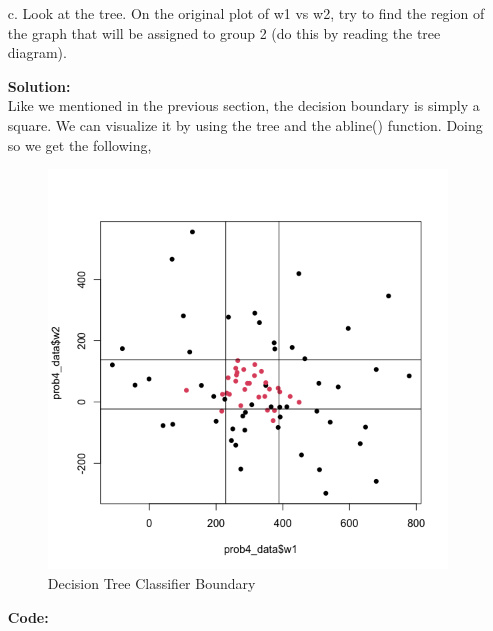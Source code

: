 \documentclass[12pt]{article}
\makeatletter
\theoremstyle{homework}
\newenvironment{exercise}[1]
{\def\@currentlabel{#1}\exercisecore}
{\endexercisecore}
\newcommand{\localhead}[1]{\par\smallskip\noindent\textbf{#1}\nobreak\\}%
\newcommand\solution{\localhead{Solution:}}
\makeatother
\begin{document}
\begin{exercise}{4}
\begin{enumerate}
      \item[c.]Look at the tree. On the original plot of w1 vs w2, try to find the region of the graph that will be assigned to group 2 (do this by reading the
      tree diagram).\\
      \solution Like we mentioned in the previous section, the decision boundary is simply a square. We can visualize it by using the tree and the abline() function. Doing so we get the following, 
      \begin{figure}[H]
        \begin{center}
          \caption{Decision Tree Classifier Boundary}
        \includegraphics[width = \textwidth]{Rplot03.png}
        \end{center}
      \end{figure}
      \textbf{Code:}
      \begin{center}
      
      \end{center}


      







  \end{enumerate}
  
\end{exercise}
\end{document}
